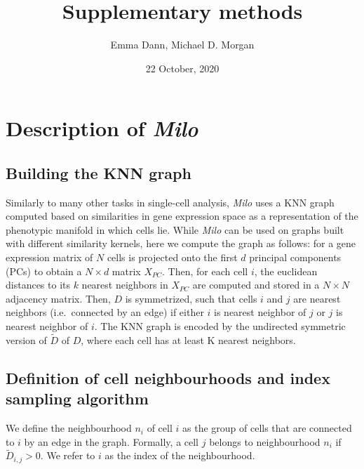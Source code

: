 \documentclass[
]{article}
\title{Supplementary methods}
\author{Emma Dann, Michael D. Morgan}
\date{22 October, 2020}
\begin{document}
\maketitle

\hypertarget{description-of-milo}{%
\section{\texorpdfstring{Description of
\emph{Milo}}{Description of Milo}}\label{description-of-milo}}

\hypertarget{building-the-knn-graph}{%
\subsection{Building the KNN graph}\label{building-the-knn-graph}}

Similarly to many other tasks in single-cell analysis, \emph{Milo} uses
a KNN graph computed based on similarities in gene expression space as a
representation of the phenotypic manifold in which cells lie. While
\emph{Milo} can be used on graphs built with different similarity
kernels, here we compute the graph as follows: for a gene expression
matrix of \(N\) cells is projected onto the first \(d\) principal
components (PCs) to obtain a \(N \times d\) matrix \(X_{PC}\). Then, for
each cell \(i\), the euclidean distances to its \(k\) nearest neighbors
in \(X_{PC}\) are computed and stored in a \(N \times N\) adjacency
matrix. Then, \(D\) is symmetrized, such that cells \(i\) and \(j\) are
nearest neighbors (i.e.~connected by an edge) if either \(i\) is nearest
neighbor of \(j\) or \(j\) is nearest neighbor of \(i\). The KNN graph
is encoded by the undirected symmetric version of \(\tilde{D}\) of
\(D\), where each cell has at least K nearest neighbors.

\hypertarget{definition-of-cell-neighbourhoods-and-index-sampling-algorithm}{%
\subsection{Definition of cell neighbourhoods and index sampling
algorithm}\label{definition-of-cell-neighbourhoods-and-index-sampling-algorithm}}

We define the neighbourhood \(n_i\) of cell \(i\) as the group of cells
that are connected to \(i\) by an edge in the graph. Formally, a cell
\(j\) belongs to neighbourhood \(n_i\) if \(\tilde{D}_{i,j} > 0\). We
refer to \(i\) as the index of the neighbourhood.
\end{document}
